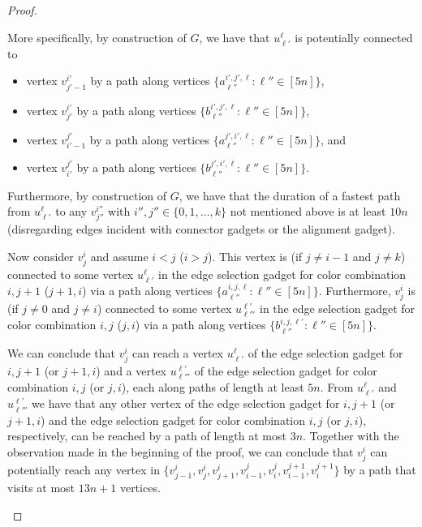 \documentclass[a4paper,UKenglish,cleveref, autoref, thm-restate]{lipics-v2021}
\begin{document}
\begin{proof}
\begin{claimproof}
    More specifically, by construction of $G$, we have that $u^\ell_{\ell'}$ is potentially connected to 
    \begin{itemize}
        \item vertex $v^{i'}_{j'-1}$ by a path along vertices $\{a^{i',j',\ell}_{\ell''} :  \ell''\in[5n]\}$,
        \item vertex $v^{i'}_{j'}$ by a path along vertices $\{b^{i',j',\ell}_{\ell''} :  \ell''\in[5n]\}$, 
        \item vertex $v^{j'}_{i'-1}$ by a path along vertices $\{a^{j',i',\ell}_{\ell''} :  \ell''\in[5n]\}$, and
        \item vertex $v^{j'}_{i'}$ by a path along vertices $\{b^{j',i',\ell}_{\ell''} :  \ell''\in[5n]\}$.
    \end{itemize}
    Furthermore, by construction of $G$, we have that the duration of a fastest path from $u^\ell_{\ell'}$ to any $v^{i''}_{j''}$ with $i'',j''\in\{0,1,\ldots,k\}$ not mentioned above is at least $10n$ (disregarding edges incident with connector gadgets or the alignment gadget).

    Now consider $v^i_j$ and assume $i<j$ ($i>j$). This vertex is (if $j\neq i-1$ and $j\neq k$) connected to some vertex $u^\ell_{\ell'}$ in the edge selection gadget for color combination $i,j+1$ ($j+1,i$) via a path along vertices $\{a^{i,j,\ell}_{\ell''} :  \ell''\in[5n]\}$. Furthermore, $v^i_j$ is (if $j\neq 0$ and $j\neq i$) connected to some vertex $u^{\ell'}_{\ell'''}$ in the edge selection gadget for color combination $i,j$ ($j,i$) via a path along vertices $\{b^{i,j,\ell'}_{\ell''} :  \ell''\in[5n]\}$.

    We can conclude that $v^i_j$ can reach a vertex $u^\ell_{\ell'}$ of the edge selection gadget for $i,j+1$ (or $j+1,i$) and a vertex $u^{\ell'}_{\ell'''}$ of the edge selection gadget for color combination $i,j$ (or $j,i$), each along paths of length at least $5n$. From $u^\ell_{\ell'}$ and $u^{\ell'}_{\ell'''}$ we have that any other vertex of the edge selection gadget for $i,j+1$ (or $j+1,i$) and the edge selection gadget for color combination $i,j$ (or $j,i$), respectively, can be reached by a path of length at most $3n$. Together with the observation made in the beginning of the proof, we can conclude that $v^i_j$ can potentially reach any vertex in $\{v^i_{j-1},v^i_j,v^i_{j+1},v^j_{i-1},v^j_i,v^{j+1}_{i-1},v^{j+1}_i\}$ by a path that visits at most $13n+1$ vertices. 
    

\end{claimproof}
\end{proof}
\end{document}
